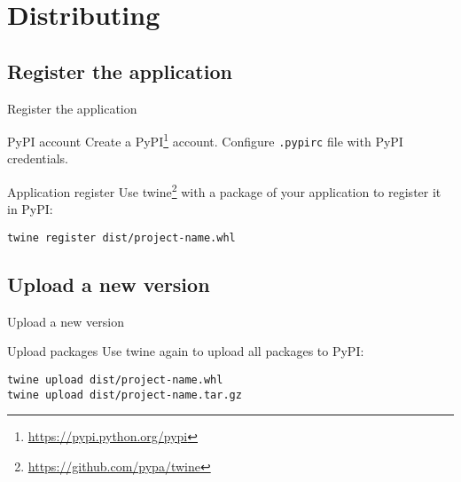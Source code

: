 \section{Distributing}
\subsection{Register the application}
\begin{frame}[fragile]{Register the application}
    \begin{block}{PyPI account}
        Create a PyPI\footnote[1]{\href{https://pypi.python.org/pypi}{https://pypi.python.org/pypi}} account.
        Configure \texttt{.pypirc} file with PyPI credentials.
    \end{block}
    \pause
    \begin{block}{Application register}
        Use twine\footnote[2]{\href{https://github.com/pypa/twine}{https://github.com/pypa/twine}} with a package of your application to register it in PyPI:
        \begin{verbatim}
twine register dist/project-name.whl
        \end{verbatim}
    \end{block}
\end{frame}

\subsection{Upload a new version}
\begin{frame}[fragile]{Upload a new version}
    \begin{block}{Upload packages}
        Use twine again to upload all packages to PyPI:
        \begin{verbatim}
twine upload dist/project-name.whl
twine upload dist/project-name.tar.gz
        \end{verbatim}
    \end{block}
\end{frame}
 
